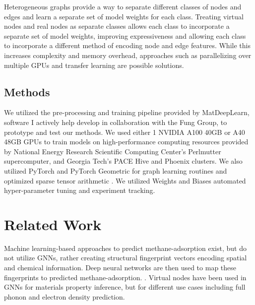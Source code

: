 \documentclass{lxaiproposal}
\begin{document}
Heterogeneous graphs provide a way to separate different classes of nodes and edges and learn a separate set of model weights for each class. Treating virtual nodes and real nodes as separate classes allows each class to incorporate a separate set of model weights, improving expressiveness and allowing each class to incorporate a different method of encoding node and edge features. While this increases complexity and memory overhead, approaches such as parallelizing over multiple GPUs and transfer learning are possible solutions.

\subsection*{Methods}

We utilized the pre-processing and training pipeline provided by MatDeepLearn\cite{fung2021benchmarking}, software I actively help develop in collaboration with the Fung Group, to prototype and test our methods. We used either 1 NVIDIA A100 40GB or A40 48GB GPUs to train models on high-performance computing resources provided by National Energy Research Scientific Computing Center's Perlmutter supercomputer, and Georgia Tech's PACE Hive and Phoenix clusters\cite{PACE}. We also utilized PyTorch\cite{pytorch} and PyTorch Geometric for graph learning routines and optimized sparse tensor arithmetic \cite{Fey2019FastGR}. We utilized Weights and Biases\cite{wandb} automated hyper-parameter tuning and experiment tracking.

\section*{Related Work}

Machine learning-based approaches to predict methane-adsorption exist, but do not utilize GNNs, rather creating structural fingerprint vectors encoding spatial and chemical information. Deep neural networks are then used to map these fingerprints to predicted methane-adsorption. \cite{gurnani2021interpretable}. 
Virtual nodes have been used in GNNs for materials property inference, but for different use cases including full phonon\cite{https://doi.org/10.48550/arxiv.2010.09435} and electron density prediction\cite{jorgensen2022equivariant}.



\end{document}
